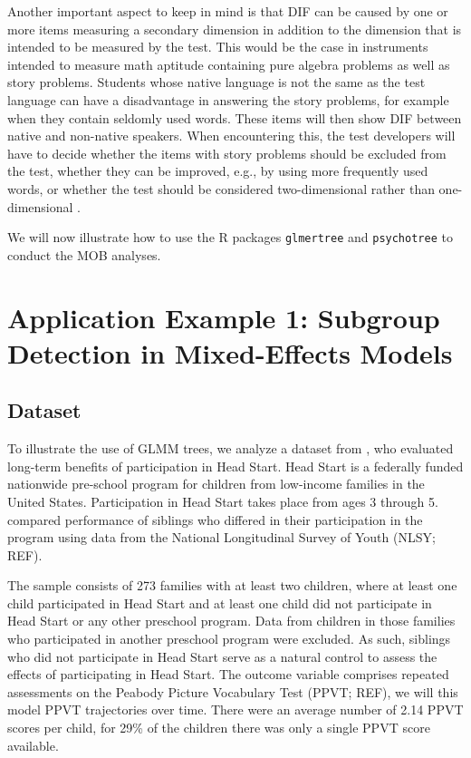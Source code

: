\documentclass[doc,floatsintext,natbib]{apa7}
\begin{document}
Another important aspect to keep in mind is that DIF can be caused by one or more items measuring a secondary dimension in addition to the dimension that is intended to be measured by the test. This would be the case in instruments intended to measure math aptitude containing pure algebra problems as well as story problems. Students whose native language is not the same as the test language can have a disadvantage in answering the story problems, for example when they contain seldomly used words. These items will then show DIF between native and non-native speakers. When encountering this, the test developers will have to decide whether the items with story problems should be excluded from the test, whether they can be improved, e.g., by using more frequently used words, or whether the test should be considered two-dimensional rather than one-dimensional \citep[see also][for a discussion of the connection between DIF and multidimensionality]{Ack:1992,Stretal:2021:APM}.

We will now illustrate how to use the R packages \texttt{glmertree} and \texttt{psychotree} to conduct the MOB analyses. 




\newpage
\section{Application Example 1: Subgroup Detection in Mixed-Effects Models}
\label{sec:TutorialMixed}



\subsection{Dataset}

To illustrate the use of GLMM trees, we analyze a dataset from \cite{Demi09}, who evaluated long-term benefits of participation in Head Start. Head Start is a federally funded nationwide pre-school program for children from low-income families in the United States. Participation in Head Start takes place from ages 3 through 5. \cite{Demi09} compared performance of siblings who differed in their participation in the program using data from the National Longitudinal Survey of Youth (NLSY; REF). 

The sample consists of 273 families with at least two children, where at least one child participated in Head Start and at least one child did not participate in Head Start or any other preschool program. Data from children in those families who participated in another preschool program were excluded. As such, siblings who did not participate in Head Start serve as a natural control to assess the effects of participating in Head Start. The outcome variable comprises repeated assessments on the Peabody Picture Vocabulary Test (PPVT; REF), we will this model PPVT trajectories over time. There were an average number of 2.14 PPVT scores per child, for 29\% of the children there was only a single PPVT score available. 
\end{document}
